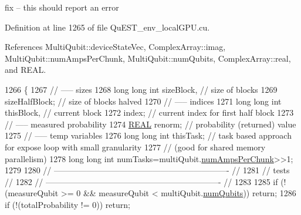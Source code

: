 fix -- this should report an error 

Definition at line 1265 of file Qu\+E\+S\+T\+\_\+env\+\_\+local\+G\+P\+U.\+cu.



References Multi\+Qubit\+::device\+State\+Vec, Complex\+Array\+::imag, Multi\+Qubit\+::num\+Amps\+Per\+Chunk, Multi\+Qubit\+::num\+Qubits, Complex\+Array\+::real, and R\+E\+AL.


\begin{DoxyCode}
1266 \{
1267     \textcolor{comment}{// ----- sizes}
1268     \textcolor{keywordtype}{long} \textcolor{keywordtype}{long} \textcolor{keywordtype}{int} sizeBlock,                                           \textcolor{comment}{// size of blocks}
1269          sizeHalfBlock;                                       \textcolor{comment}{// size of blocks halved}
1270     \textcolor{comment}{// ----- indices}
1271     \textcolor{keywordtype}{long} \textcolor{keywordtype}{long} \textcolor{keywordtype}{int} thisBlock,                                           \textcolor{comment}{// current block}
1272          index;                                               \textcolor{comment}{// current index for first half block}
1273     \textcolor{comment}{// ----- measured probability}
1274     \mbox{\hyperlink{QuEST__precision_8h_a4b654506f18b8bfd61ad2a29a7e38c25}{REAL}}   renorm;                                    \textcolor{comment}{// probability (returned) value}
1275     \textcolor{comment}{// ----- temp variables}
1276     \textcolor{keywordtype}{long} \textcolor{keywordtype}{long} \textcolor{keywordtype}{int} thisTask;                                   \textcolor{comment}{// task based approach for expose loop with
       small granularity}
1277     \textcolor{comment}{// (good for shared memory parallelism)}
1278     \textcolor{keywordtype}{long} \textcolor{keywordtype}{long} \textcolor{keywordtype}{int} numTasks=multiQubit.\mbox{\hyperlink{structMultiQubit_a1cad83601a78635dd278259c7ed54f18}{numAmpsPerChunk}}>>1;
1279 
1280     \textcolor{comment}{// ---------------------------------------------------------------- //}
1281     \textcolor{comment}{//            tests                                                 //}
1282     \textcolor{comment}{// ---------------------------------------------------------------- //}
1283 
1285     \textcolor{keywordflow}{if} (!(measureQubit >= 0 && measureQubit < multiQubit.\mbox{\hyperlink{structMultiQubit_ab5b9795bdc6fb5855e1974dcbbaeb36f}{numQubits}})) \textcolor{keywordflow}{return};
1286     \textcolor{keywordflow}{if} (!(totalProbability != 0)) \textcolor{keywordflow}{return};

\end{DoxyCode}
